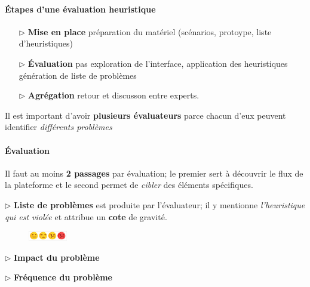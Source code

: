 \documentclass{report}
\begin{document}
\begin{multicols*}{3}
    \paragraph{Étapes d'une évaluation heuristique}
    \begin{itemize}
      \item [$\rhd $] \textbf{Mise en place} préparation du matériel 
        (scénarios, protoype, liste d'heuristiques)  
      \item [$\rhd$ ] \textbf{Évaluation} pas exploration de l'interface, application 
        des heuristiques génération de liste de problèmes
      \item [$\rhd $] \textbf{Agrégation}  retour et discusson entre experts.
    \end{itemize}   

    \begin{note}{}{}
      Il est important d'avoir \textbf{plusieurs évaluateurs} parce chacun d'eux peuvent 
        identifier \textit{différents problèmes}  
    \end{note}

    \paragraph{Évaluation}
    Il faut au moins \textbf{2 passages} par évaluation; le premier sert 
    à découvrir le flux de la plateforme et le second permet de 
    \textit{cibler} des éléments spécifiques.   

    \noindent $\rhd$ \textbf{Liste de problèmes} est produite par l'évaluateur; 
    il y mentionne \textit{l'heuristique qui est violée} et attribue 
    un \textbf{cote} de gravité.   

    \begin{figure}[H]
      \begin{center}
        \includegraphics[width=0.15\textwidth]{CotteGravite.png}
      \end{center}
    \end{figure}
    \vspace{-2em}

    \noindent $\rhd$ \textbf{Impact du problème}   

    \noindent $\rhd$ \textbf{Fréquence du problème}   



\end{multicols*}
\end{document}

